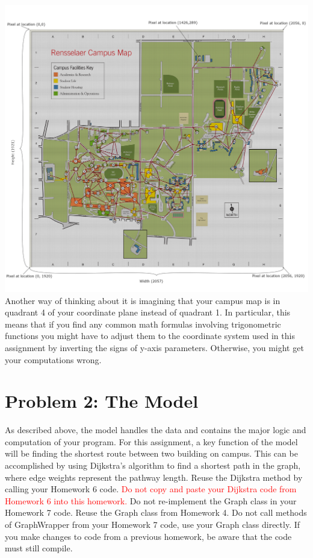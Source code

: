 \documentclass[11pt]{article}
\begin{document}
\includegraphics[scale=0.13]{RPI_campus_map_2010_extra_nodes_edges2_grid.png}
\newline
Another way of thinking about it is imagining that your campus map is in quadrant 4 of your coordinate plane instead of quadrant 1. In particular, this means that if you find any common math formulas involving trigonometric functions you might have to adjust them to the coordinate system used in this assignment by inverting the signs of y-axis parameters. Otherwise, you might get your computations wrong.

\section*{Problem 2: The Model}
\label{sec:Problem 2}

\noindent As described above, the model handles the data and contains the major logic and computation of your program. For this assignment, a key function of the model will be finding the shortest route between two building on campus. This can be accomplished by using Dijkstra's algorithm to find a shortest path in the graph, where edge weights represent the pathway length. Reuse the Dijkstra method by calling your Homework 6 code. \textcolor{red}{Do not copy and paste your Dijkstra code from Homework 6 into this homework.} Do not re-implement the Graph class in your Homework 7 code. Reuse the Graph class from Homework 4. Do not call methods of GraphWrapper from your Homework 7 code, use your Graph class directly. If you make changes to code from a previous homework, be aware that the code must still compile.
\end{document}
